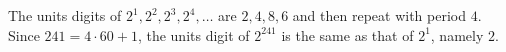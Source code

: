 The units digits of $2^1,2^2,2^3,2^4,\ldots$ are $2,4,8,6$ and then repeat with period $4$. Since $241=4\cdot60+1$, the units digit of $2^{241}$ is the same as that of $2^1$, namely $\boxed{2}$.
